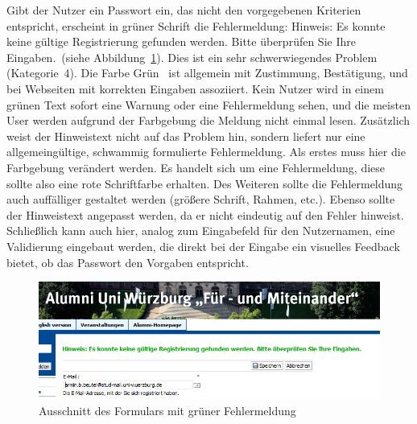 {
Gibt der Nutzer ein Passwort ein, das nicht den vorgegebenen Kriterien entspricht, erscheint in grüner Schrift die Fehlermeldung: \glqq Hinweis: Es konnte keine gültige Registrierung gefunden werden. Bitte überprüfen Sie Ihre Eingaben.\grqq ~(siehe Abbildung~\ref{fig:greenerror}).
}
{
Dies ist ein sehr schwerwiegendes Problem (Kategorie~4). Die Farbe \glqq Grün\grqq ~ ist allgemein mit Zustimmung, Bestätigung, und bei Webseiten mit korrekten Eingaben assoziiert. Kein Nutzer wird in einem grünen Text sofort eine Warnung oder eine Fehlermeldung sehen, und die meisten User werden aufgrund der Farbgebung die Meldung nicht einmal lesen. Zusätzlich weist der Hinweistext nicht auf das Problem hin, sondern liefert nur eine allgemeingültige, schwammig formulierte Fehlermeldung.
}
{
Als erstes muss hier die Farbgebung verändert werden. Es handelt sich um eine Fehlermeldung, diese sollte also eine rote Schriftfarbe erhalten. Des Weiteren sollte die Fehlermeldung auch auffälliger gestaltet werden (größere Schrift, Rahmen, etc.). Ebenso sollte der Hinweistext angepasst werden, da er nicht eindeutig auf den Fehler hinweist. Schließlich kann auch hier, analog zum Eingabefeld für den Nutzernamen, eine Validierung eingebaut werden, die direkt bei der Eingabe ein visuelles Feedback bietet, ob das Passwort den Vorgaben entspricht.
}
\label{prob:frei:warntextgruen}

\begin{figure}
	\centering
		\includegraphics[width=\textwidth]{figures/greenerror.png}
	\caption{Ausschnitt des Formulars mit grüner Fehlermeldung}
	\label{fig:greenerror}
\end{figure}


